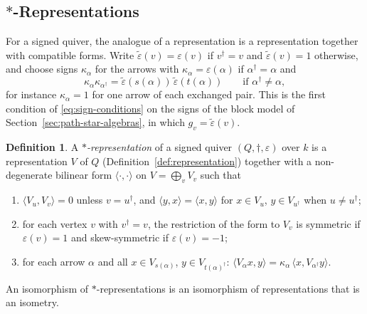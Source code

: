 \documentclass[12pt, a4paper]{report}
\theoremstyle{plain}
\theoremstyle{definition}
\newtheorem{definition}[theorem]{Definition}
\theoremstyle{remark}
\theoremstyle{plain}
\begin{document}
\subsection{\texorpdfstring{$*$}{*}-Representations}
\label{sec:star-reps}
For a signed quiver, the analogue of a representation is a representation together with compatible forms. Write $\tilde\varepsilon(v)=\varepsilon(v)$ if $v^\dagger=v$ and $\tilde\varepsilon(v)=1$ otherwise, and choose signs $\kappa_\alpha$ for the arrows with $\kappa_\alpha=\varepsilon(\alpha)$ if $\alpha^\dagger=\alpha$ and
\[ \kappa_\alpha\kappa_{\alpha^\dagger}=\tilde\varepsilon(s(\alpha))\,\tilde\varepsilon(t(\alpha))\qquad\text{if }\alpha^\dagger\neq\alpha , \]
for instance $\kappa_\alpha=1$ for one arrow of each exchanged pair. This is the first condition of \eqref{eq:sign-conditions} on the signs of the block model of Section~\ref{sec:path-star-algebras}, in which $g_v=\tilde\varepsilon(v)$.

\begin{definition}\label{def:star-rep}
A \emph{$*$-representation} of a signed quiver $(Q,\dagger,\varepsilon)$ over $k$ is a representation $V$ of $Q$ (Definition~\ref{def:representation}) together with a non-degenerate bilinear form $\langle\cdot,\cdot\rangle$ on $V=\bigoplus_vV_v$ such that
\begin{enumerate}
  \item $\langle V_u,V_v\rangle=0$ unless $v=u^\dagger$, and $\langle y,x\rangle=\langle x,y\rangle$ for $x\in V_u$, $y\in V_{u^\dagger}$ when $u\neq u^\dagger$;
  \item for each vertex $v$ with $v^\dagger=v$, the restriction of the form to $V_v$ is symmetric if $\varepsilon(v)=1$ and skew-symmetric if $\varepsilon(v)=-1$;
  \item for each arrow $\alpha$ and all $x\in V_{s(\alpha)}$, $y\in V_{t(\alpha)^\dagger}$: $\langle V_\alpha x,y\rangle=\kappa_\alpha\,\langle x,V_{\alpha^\dagger}y\rangle$.
\end{enumerate}
An isomorphism of $*$-representations is an isomorphism of representations that is an isometry.
\end{definition}
\end{document}

